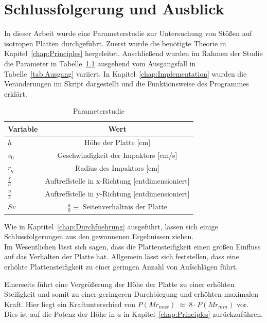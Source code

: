 \chapter{Schlussfolgerung und Ausblick}
\label{Conclusion}

In dieser Arbeit wurde eine Parameterstudie zur Untersuchung von Stößen auf isotropen Platten durchgeführt. Zuerst wurde die benötigte Theorie in Kapitel~\ref{chap:Principles} hergeleitet. Anschließend wurden im Rahmen der Studie die Parameter in Tabelle~\ref{tab:VariierteParams} ausgehend vom Ausgangsfall in Tabelle~\ref{tab:Ausgang} variiert. In Kapitel~\ref{chap:Implementation} wurden die Veränderungen im Skript dargestellt und die Funktionsweise des Programmes erklärt. 

\begin{table}[H]
	\begin{center}
		\caption{Parameterstudie}
		\label{tab:VariierteParams}
		\begin{tabular}{l|c}
			\textbf{Variable} & \textbf{Wert}\\
			\hline
			$h$ & Höhe der Platte [cm]\\
			$v_{0}$ & Geschwindigkeit der Impaktors [cm/s]\\
			$r_{g}$ & Radius des Impaktors [cm]\\
			$\frac{\xi}{a}$ & Auftreffstelle in x-Richtung [entdimensioniert]\\
			$\frac{\eta}{b}$ & Auftreffstelle in y-Richtung [entdimensioniert]\\
			$Sv$ & $\frac{a}{b} \equiv \; \mbox{Seitenverhältnis der Platte}$ \\		
		\end{tabular}
	\end{center}
\end{table}

Wie in Kaptitel~\ref{chap:Durchfuehrung} ausgeführt, lassen sich einige Schlussfolgerungen aus den gewonnenen Ergebnissen ziehen. \\

Im Wesentlichen lässt sich sagen, dass die Plattensteifigkeit einen großen Einfluss auf das Verhalten der Platte hat. Allgemein lässt sich feststellen, dass eine erhöhte Plattensteifigkeit zu einer geringen Anzahl von Aufschlägen führt.

Einerseits führt eine Vergrößerung der Höhe der Platte zu einer erhöhten Steifigkeit und somit zu einer geringeren Durchbiegung und erhöhten maximalen Kraft. Hier liegt ein Kraftunterschied von $P(Mr_{max}) \; \approx \; 8 \cdot P(Mr_{min})$ vor. Dies ist auf die Potenz der Höhe in $\overline{a}$ in Kapitel~\ref{chap:Principles} zurückzuführen.


